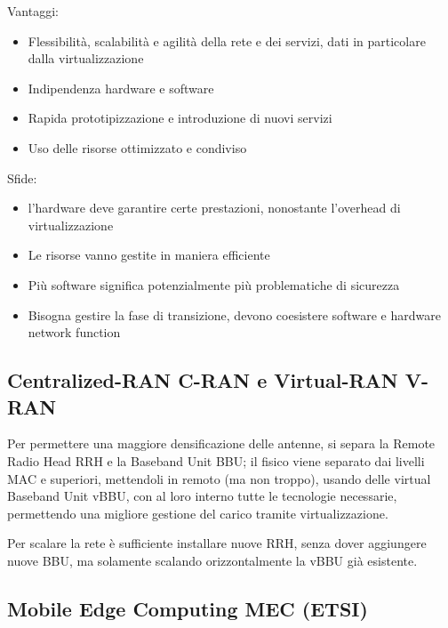 Vantaggi: 
\begin{itemize}
    \item Flessibilità, scalabilità e agilità della rete e dei servizi, dati in particolare dalla virtualizzazione
    
    \item Indipendenza hardware e software
    
    \item Rapida prototipizzazione e introduzione di nuovi servizi
    
    \item Uso delle risorse ottimizzato e condiviso 
\end{itemize}

Sfide: 
\begin{itemize}
    \item l'hardware deve garantire certe prestazioni, nonostante l'overhead di virtualizzazione
    
    \item Le risorse vanno gestite in maniera efficiente
    
    \item Più software significa potenzialmente più problematiche di sicurezza
    
    \item Bisogna gestire la fase di transizione, devono coesistere software e hardware network function
\end{itemize}

\subsection{Centralized-RAN C-RAN e Virtual-RAN V-RAN}

Per permettere una maggiore densificazione delle antenne, si separa la Remote Radio Head RRH e la Baseband Unit BBU; il fisico viene separato dai livelli MAC e superiori, mettendoli in remoto (ma non troppo), usando delle virtual Baseband Unit vBBU, con al loro interno tutte le tecnologie necessarie, permettendo una migliore gestione del carico tramite virtualizzazione.

Per scalare la rete è sufficiente installare nuove RRH, senza dover aggiungere nuove BBU, ma solamente scalando orizzontalmente la vBBU già esistente.

\subsection{Mobile Edge Computing MEC (ETSI)}

